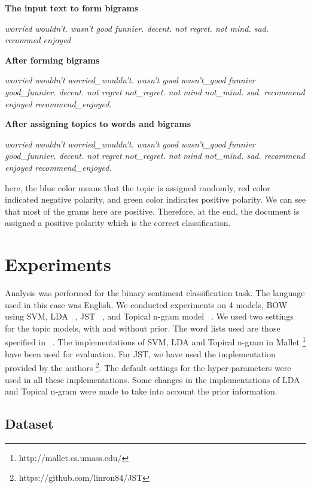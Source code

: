 \textbf{The input text to form bigrams}

\textit{worried wouldn't. wasn't good funnier. decent. not regret. not mind. sad. recommed enjoyed}

\textbf{After forming bigrams}

\textit{worried wouldn't worried\_wouldn't. wasn't good wasn't\_good funnier good\_funnier. decent. not regret not\_regret. not mind not\_mind. sad. recommend enjoyed 
recommend\_enjoyed.}

\textbf{After assigning topics to words and bigrams}

\textit{{\color{blue}worried} {\color{blue}wouldn't worried\_wouldn't.} {\color{red}wasn't good wasn't\_good} {\color{green}funnier good\_funnier.} {\color{green}decent.}
{\color{green}not regret not\_regret.} {\color{green}not mind not\_mind.} {\color{red}sad.} {\color{green}recommend enjoyed recommend\_enjoyed.}}

here, the blue color means that the topic is assigned randomly, red color indicated negative polarity, and green color indicates positive polarity. We can see that most of 
the grams here are positive. Therefore, at the end, the document is assigned a positive polarity which is the correct classification.

\section{Experiments}\label{experiments}

Analysis was performed for the binary sentiment classification task. The language used in this case was English. We conducted experiments on 4 models, BOW using SVM, LDA 
~\citep*{blei2003latent}, JST ~\citep*{lin2009joint}, and Topical n-gram model ~\citep*{wang2007topical}. We used two settings for the topic models, with and without prior. 
The word lists used are those specified in ~\citep*{liu2010sentiment}. The implementations of SVM, LDA and Topical n-gram in Mallet \footnote{http://mallet.cs.umass.edu/} 
have been used for evaluation. For JST, we have used the implementation provided by the authors \footnote{https://github.com/linron84/JST}. The default settings for the
hyper-parameters were used in all these implementations. Some changes in the implementations of LDA and Topical n-gram were made to take into account the prior information.

\subsection{Dataset}

